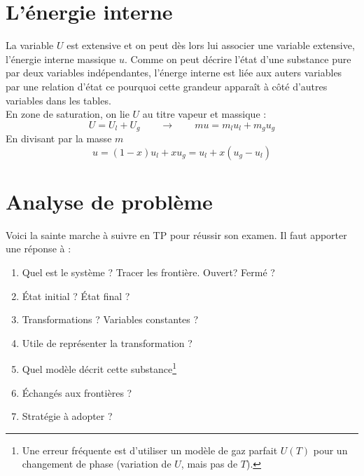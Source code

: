 \section{L'énergie interne}
La variable $U$ est extensive et on peut dès lors lui associer une 
variable extensive, l'énergie interne massique $u$. Comme on peut 
décrire l'état d'une substance pure par deux variables indépendantes, 
l'énerge interne est liée aux auters variables par une relation d'état 
ce pourquoi cette grandeur apparaît à côté d'autres variables dans les 
tables.\\
En zone de saturation, on lie $U$ au titre vapeur et massique :
\begin{equation}
U = U_l+U_g \qquad\rightarrow\qquad mu = m_lu_l + m_gu_g
\end{equation}
En divisant par la masse $m$
\begin{equation}
u = (1-x)u_l + xu_g = u_l + x(u_g-u_l)
\end{equation}

\section{Analyse de problème}
Voici la sainte marche à suivre en TP pour réussir son examen. Il 
faut apporter une réponse à : 
\begin{enumerate}
\item Quel est le système ? Tracer les frontière. Ouvert? Fermé ?
\item État initial ? État final ?
\item Transformations ? Variables constantes ?
\item Utile de représenter la transformation ?
\item Quel modèle décrit cette substance\footnote{Une erreur fréquente 
est d'utiliser un modèle de gaz parfait $U(T)$ pour un changement de 
phase (variation de $U$, mais pas de $T$).}
\item Échangés aux frontières ?
\item Stratégie à adopter ?
\end{enumerate}

